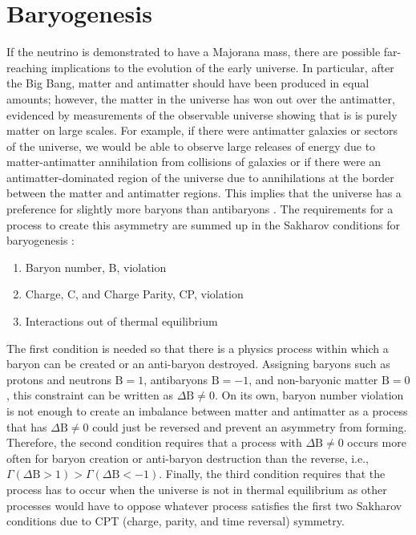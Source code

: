 \section{Baryogenesis}
If the neutrino is demonstrated to have a Majorana mass, there are possible far-reaching implications to the evolution of the early universe.
In particular, after the Big Bang, matter and antimatter should have been produced in equal amounts; however, the matter in the universe has won out over the antimatter, evidenced by measurements of the observable universe showing that is is purely matter on large scales.
For example, if there were antimatter galaxies or sectors of the universe, we would be able to observe large releases of energy due to matter-antimatter annihilation from collisions of galaxies or if there were an antimatter-dominated region of the universe due to annihilations at the border between the matter and antimatter regions.
This implies that the universe has a preference for slightly more baryons than antibaryons \cite{Canetti:2012zc}.
The requirements for a process to create this asymmetry are summed up in the Sakharov conditions for baryogenesis \cite{Sakharov:1967dj}:
\begin{enumerate}
\item Baryon number, B, violation
\item Charge, C, and Charge Parity, CP, violation
\item Interactions out of thermal equilibrium
\end{enumerate}
The first condition is needed so that there is a physics process within which a baryon can be created or an anti-baryon destroyed.
Assigning baryons such as protons and neutrons $\textrm{B}=1$, antibaryons $\textrm{B}=-1$, and non-baryonic matter $\textrm{B}=0$, this constraint can be written as $\Delta \textrm{B}\neq0$.
On its own, baryon number violation is not enough to create an imbalance between matter and antimatter as a process that has $\Delta\textrm{B}\neq0$ could just be reversed and prevent an asymmetry from forming.
Therefore, the second condition requires that a process with $\Delta\textrm{B}\neq0$ occurs more often for baryon creation or anti-baryon destruction than the reverse, i.e., $\Gamma(\Delta \textrm{B}>1) > \Gamma(\Delta \textrm{B}<-1)$.
Finally, the third condition requires that the process has to occur when the universe is not in thermal equilibrium as other processes would have to oppose whatever process satisfies the first two Sakharov conditions due to CPT (charge, parity, and time reversal) symmetry.

